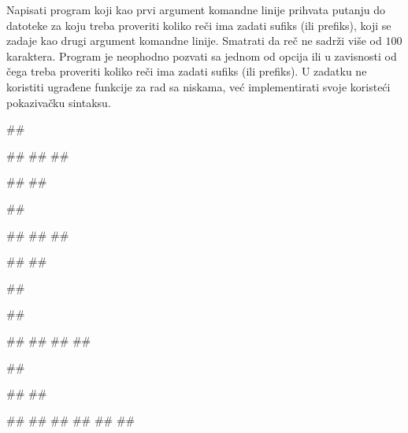\begin{Exercise}[label=2_07]
Napisati program koji kao prvi argument komandne linije prihvata
putanju do datoteke za koju treba proveriti koliko reči ima
zadati sufiks (ili prefiks), koji se zadaje kao drugi argument
komandne linije. Smatrati da reč ne sadrži više od $100$ karaktera.
Program je neophodno pozvati sa jednom od opcija
 ili  u zavisnosti od čega treba proveriti
koliko reči ima zadati sufiks (ili prefiks). U zadatku ne
koristiti ugrađene funkcije za rad sa niskama, već
implementirati svoje koristeći pokazivačku sintaksu.

\begin{miditest}
\begin{upotreba}{1}
##

##
##
##

#\naslovInt#
##
\end{upotreba}
\end{miditest}
\begin{miditest}
\begin{upotreba}{2}
##

##
##
##

#\naslovInt#
##
\end{upotreba}
\end{miditest}

\begin{miditest}
\begin{upotreba}{3}
##

##

#\naslovInt#
#\naslovIzlazZaGresku#
##
##
\end{upotreba}
\end{miditest}
\begin{miditest}
\begin{upotreba}{4}
##

##
##

#\naslovInt#
#\naslovIzlazZaGresku#
##
##
##
##
\end{upotreba}
\end{miditest}

\end{Exercise}
\begin{Answer}[ref=2_07]
\end{Answer}

